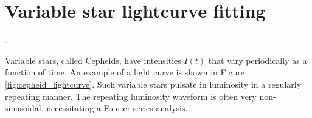 
%    

\newpage
\section{Variable star lightcurve fitting}
.

Variable stars, called Cepheids, have intensities $I(t)$ that vary
periodically as a function of time. An example of a light curve is
shown in Figure \ref{fig:cepheid_lightcurve}. Such variable stars
pulsate in luminosity in a regularly repeating manner. The repeating
luminosity waveform is often very non-sinusoidal, necessitating a
Fourier series analysis.

